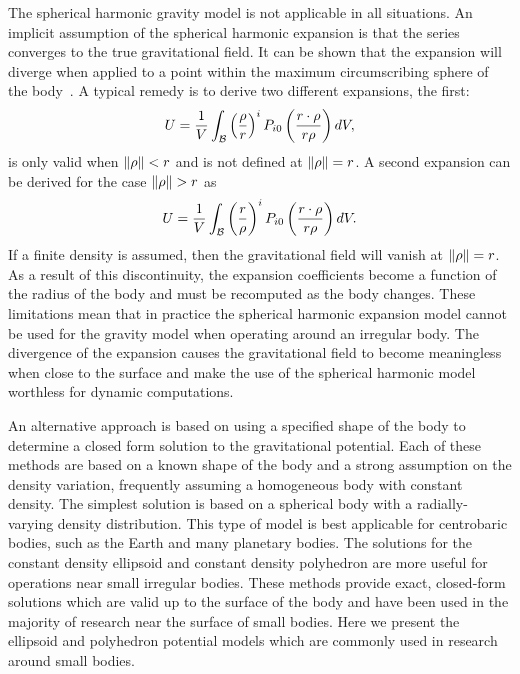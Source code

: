 The spherical harmonic gravity model is not applicable in all situations.
An implicit assumption of the spherical harmonic expansion is that the series converges to the true gravitational field.
It can be shown that the expansion will diverge when applied to a point within the maximum circumscribing sphere of the body~\cite{scheeres2012a}.
A typical remedy is to derive two different expansions, the first:
\begin{align}
    U = \frac{1}{V} \int_{\mathcal{B}} \left(  \frac{\rho}{r} \right)^i P_{i0} \left(  \frac{r \cdot \rho}{ r \rho} \right) dV, 
\end{align}
is only valid when \( \left\| \rho \right\| < r \) and is not defined at \( \left\| \rho \right\| = r\).
A second expansion can be derived for the case \(\left\| \rho \right\| > r \) as
\begin{align}
    U = \frac{1}{V} \int_{\mathcal{B}} \left(  \frac{r}{\rho} \right)^i P_{i0} \left(  \frac{r \cdot \rho}{ r \rho} \right) dV. 
\end{align}
If a finite density is assumed, then the gravitational field will vanish at \( \left\| \rho \right\| = r \).
As a result of this discontinuity, the expansion coefficients become a function of the radius of the body and must be recomputed as the body changes.
These limitations mean that in practice the spherical harmonic expansion model cannot be used for the gravity model when operating around an irregular body.
The divergence of the expansion causes the gravitational field to become meaningless when close to the surface and make the use of the spherical harmonic model worthless for dynamic computations.

An alternative approach is based on using a specified shape of the body to determine a closed form solution to the gravitational potential.
Each of these methods are based on a known shape of the body and a strong assumption on the density variation, frequently assuming a homogeneous body with constant density.
The simplest solution is based on a spherical body with a radially-varying density distribution.
This type of model is best applicable for centrobaric bodies, such as the Earth and many planetary bodies.
The solutions for the constant density ellipsoid and constant density polyhedron are more useful for operations near small irregular bodies.
These methods provide exact, closed-form solutions which are valid up to the surface of the body and have been used in the majority of research near the surface of small bodies.
Here we present the ellipsoid and polyhedron potential models which are commonly used in research around small bodies.


